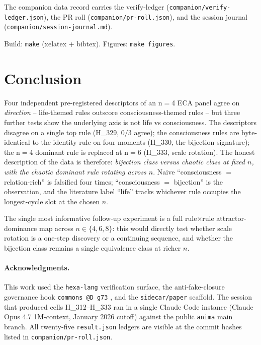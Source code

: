 \documentclass[11pt,a4paper]{article}
\begin{document}
The companion data record carries the verify-ledger
(\texttt{companion/verify-ledger.json}), the PR roll
(\texttt{companion/pr-roll.json}), and the session journal
(\texttt{companion/session-journal.md}).

Build: \texttt{make} (xelatex + bibtex). Figures: \texttt{make figures}.

\section{Conclusion}
\label{sec:conclusion}

Four independent pre-registered descriptors of an n$=$4 ECA panel agree
on \emph{direction} -- life-themed rules outscore consciousness-themed
rules -- but three further tests show the underlying axis is not
life vs consciousness. The descriptors disagree on a single top rule
(H\_329, $0/3$ agree); the consciousness rules are byte-identical to
the identity rule on four moments (H\_330, the bijection signature);
the n$=$4 dominant rule is replaced at n$=$6 (H\_333, scale rotation).
The honest description of the data is therefore:
\emph{bijection class versus chaotic class at fixed $n$, with the
chaotic dominant rule rotating across $n$}. Naive
``consciousness $=$ relation-rich'' is falsified
four times; ``consciousness $=$ bijection'' is the
observation, and the literature label ``life'' tracks
whichever rule occupies the longest-cycle slot at the chosen $n$.

The single most informative follow-up experiment is a full
rule$\times$rule attractor-dominance map across $n \in \{4, 6, 8\}$:
this would directly test whether scale rotation is a one-step
discovery or a continuing sequence, and whether the bijection class
remains a single equivalence class at richer $n$.

\paragraph{Acknowledgments.}
This work used the \texttt{hexa-lang} verification surface, the
anti-fake-closure governance hook \texttt{commons @D g73}
\citep{anima_g73}, and the \texttt{sidecar/paper} scaffold. The
session that produced cells H\_312--H\_333 ran in a single Claude
Code instance (Claude Opus 4.7 1M-context, January 2026 cutoff)
against the public \texttt{anima} main branch. All twenty-five
\texttt{result.json} ledgers are visible at the commit hashes listed
in \texttt{companion/pr-roll.json}.



\end{document}
